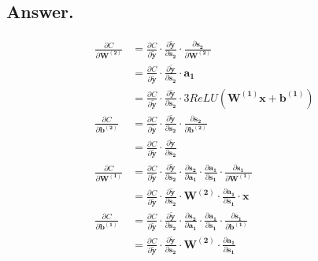 \documentclass{article}
\begin{document}
\begin{itemize}
    \subsection*{Answer.}
    \begin{align*}
    \frac{\partial C}{\partial \boldsymbol{{W^{(2)}}}} &= \frac{\partial C}{\partial \boldsymbol{{\tilde y}}} \cdot \frac{\partial \boldsymbol{{\tilde y}}}{\partial \boldsymbol{s_2}}\cdot \frac{\partial \boldsymbol{s_2}}{\partial \boldsymbol{W^{(2)}}} \\
    &= \frac{\partial C}{\partial \boldsymbol{\tilde y}} \cdot \frac{\partial \boldsymbol{\tilde y}}{\partial \boldsymbol{s_2}} \cdot \boldsymbol{a_1}\\
    &= \frac{\partial C}{\partial \boldsymbol{\tilde y}} \cdot \frac{\partial \boldsymbol{\tilde y}}{\partial \boldsymbol{s_2}} \cdot 3ReLU(\boldsymbol{W^{(1)}}\boldsymbol{x} + \boldsymbol{b^{(1)}})\\
    \frac{\partial C}{\partial \boldsymbol{b^{(2)}}} &= \frac{\partial C}{\partial \boldsymbol{\tilde y}} \cdot \frac{\partial \boldsymbol{\tilde y}}{\partial \boldsymbol{s_2}}\cdot \frac{\partial \boldsymbol{s_2}}{\partial \boldsymbol{b^{(2)}}}\\
    &= \frac{\partial C}{\partial \boldsymbol{\tilde y}} \cdot \frac{\partial \boldsymbol{\tilde y}}{\partial \boldsymbol{s_2}}\\
    \frac{\partial C}{\partial \boldsymbol{W^{(1)}}} &= \frac{\partial C}{\partial \boldsymbol{\tilde y}} \cdot \frac{\partial \boldsymbol{\tilde y}}{\partial \boldsymbol{s_2}}\cdot \frac{\partial \boldsymbol{s_2}}{\partial \boldsymbol{a_1}}\cdot \frac{\partial \boldsymbol{a_1}}{\partial \boldsymbol{s_1}}\cdot \frac{\partial \boldsymbol{s_1}}{\partial \boldsymbol{W^{(1)}}}\\
    &= \frac{\partial C}{\partial \boldsymbol{\tilde y}} \cdot \frac{\partial \boldsymbol{\tilde y}}{\partial \boldsymbol{s_2}}\cdot \boldsymbol{W^{(2)}} \cdot \frac{\partial \boldsymbol{a_1}}{\partial \boldsymbol{s_1}} \cdot \boldsymbol{x}\\
    \frac{\partial C}{\partial \boldsymbol{b^{(1)}}} &=\frac{\partial C}{\partial \boldsymbol{\tilde y}} \cdot \frac{\partial \boldsymbol{\tilde y}}{\partial \boldsymbol{s_2}}\cdot \frac{\partial \boldsymbol{s_2}}{\partial \boldsymbol{a_1}}\cdot \frac{\partial \boldsymbol{a_1}}{\partial \boldsymbol{s_1}}\cdot \frac{\partial \boldsymbol{s_1}}{\partial \boldsymbol{b^{(1)}}}\\
    &= \frac{\partial C}{\partial \boldsymbol{\tilde y}} \cdot \frac{\partial \boldsymbol{\tilde y}}{\partial \boldsymbol{s_2}}\cdot \boldsymbol{W^{(2)}} \cdot \frac{\partial \boldsymbol{a_1}}{\partial \boldsymbol{s_1}}
    \end{align*}
        

\end{itemize}
\end{document}
